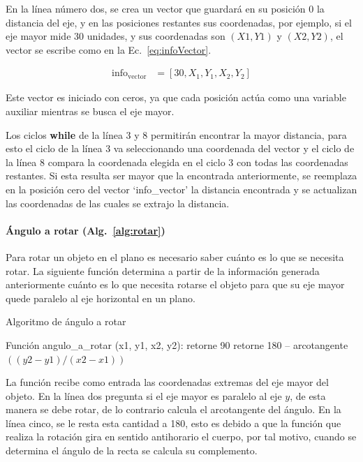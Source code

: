 En la línea número dos, se crea un vector que guardará en su posición
0 la distancia del eje, y en las posiciones restantes sus coordenadas,
por ejemplo, si el eje mayor mide 30 unidades, y sus coordenadas son
$(X1, Y1)$ y $(X2, Y2)$, el vector se escribe como en la
Ec.~\ref{eq:infoVector}.

\begin{align}
  \text{info}_{\text{vector}} & = [30, X_1, Y_1, X_2, Y_2]
  \label{eq:infoVector}
\end{align}

Este vector es iniciado con ceros, ya que cada posición actúa como una
variable auxiliar mientras se busca el eje mayor.

Los ciclos \textbf{while} de la línea 3 y 8 permitirán encontrar la mayor
distancia, para esto el ciclo de la línea 3 va seleccionando una
coordenada del vector y el ciclo de la línea 8 compara la coordenada
elegida en el ciclo 3 con todas las coordenadas restantes. Si esta
resulta ser mayor que la encontrada anteriormente, se reemplaza en la
posición cero del vector ‘info\_vector’ la distancia encontrada y se
actualizan las coordenadas de las cuales se extrajo la distancia.

\paragraph{Ángulo a rotar (Alg.~\ref{alg:rotar})}

Para rotar un objeto en el plano es necesario saber cuánto es lo que
se necesita rotar. La siguiente función determina a partir de la
información generada anteriormente cuánto es lo que necesita rotarse
el objeto para que su eje mayor quede paralelo al eje horizontal en un
plano. 

\begin{algorithm}
\caption{Algoritmo de ángulo a rotar}
\label{alg:rotar}
\begin{algorithmic}[1]
\STATE Función angulo\_a\_rotar (x1, y1, x2, y2):
\STATE retorne 90
\ELSE
\STATE retorne 180 – arcotangente $((y2 - y1)/(x2 - x1))$
\ENDIF
\end{algorithmic}
\end{algorithm}

La función recibe como entrada las coordenadas extremas del eje mayor
del objeto. En la línea dos pregunta si el eje mayor es paralelo al
eje $y$, de esta manera se debe rotar, de lo contrario calcula el
arcotangente del ángulo. En la línea cinco, se le resta esta cantidad
a 180, esto es debido a que la función que realiza la rotación gira en
sentido antihorario el cuerpo, por tal motivo, cuando se determina el
ángulo de la recta se calcula su complemento.

